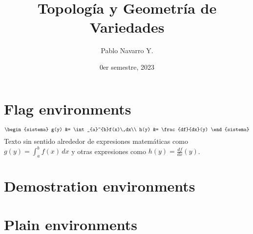 \documentclass[toc,charter]{apuntes}
\title{Topología y Geometría de Variedades}
\author{Pablo Navarro Y.}
\date{0er semestre, 2023}
\begin{document}
\renewcommand{\onlyinsubfile}[1]{}
\renewcommand{\notinsubfile}[1]{#1}
\maketitle

\section{Flag environments}
\begin{definicion}[][reff]
	\begin{equation}
		\begin{sistema}
			g(y) &= \int_{a}^{b}f(x)\,dx\\
			h(y) &= \frac{df}{dx}(y)
		\end{sistema}
	\end{equation}
	Texto sin sentido alrededor de expresiones matemáticas como \(g(y) = \int_{a}^{b}f(x)\,dx\) y otras expresiones como \(h(y) = \frac{df}{dx}(y)\).

	\lipsum[1]
\end{definicion}

\begin{prop}[][reff]
	\lipsum[1]
\end{prop}

\begin{teorema}[][reff]
	\lipsum[1]
\end{teorema}

\begin{corolario}[][reff]
	\lipsum[1]
\end{corolario}

\begin{lema}[][reff]
	\lipsum[1]
\end{lema}

\section{Demostration environments}

\begin{dem}[]
	\lipsum[1]
\end{dem}

\begin{sol}[]
	\lipsum[1]
\end{sol}

\section{Plain environments}
\end{document}
